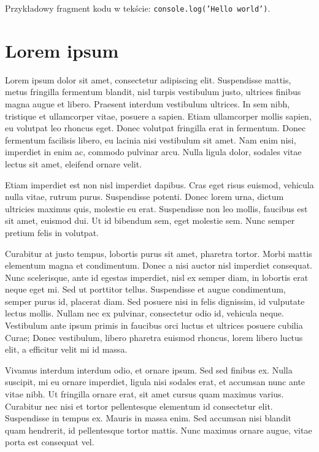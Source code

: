\documentclass[a4paper,12pt,polish,twoside]{extreport}
\begin{document}
Przykładowy fragment kodu w tekście: \texttt{console.log('Hello world')}.

\section{Lorem ipsum}
Lorem ipsum dolor sit amet, consectetur adipiscing elit. Suspendisse mattis, metus fringilla fermentum blandit, nisl turpis vestibulum justo, ultrices finibus magna augue et libero. Praesent interdum vestibulum ultrices. In sem nibh, tristique et ullamcorper vitae, posuere a sapien. Etiam ullamcorper mollis sapien, eu volutpat leo rhoncus eget. Donec volutpat fringilla erat in fermentum. Donec fermentum facilisis libero, eu lacinia nisi vestibulum sit amet. Nam enim nisi, imperdiet in enim ac, commodo pulvinar arcu. Nulla ligula dolor, sodales vitae lectus sit amet, eleifend ornare velit.

Etiam imperdiet est non nisl imperdiet dapibus. Cras eget risus euismod, vehicula nulla vitae, rutrum purus. Suspendisse potenti. Donec lorem urna, dictum ultricies maximus quis, molestie eu erat. Suspendisse non leo mollis, faucibus est sit amet, euismod dui. Ut id bibendum sem, eget molestie sem. Nunc semper pretium felis in volutpat.

Curabitur at justo tempus, lobortis purus sit amet, pharetra tortor. Morbi mattis elementum magna et condimentum. Donec a nisi auctor nisl imperdiet consequat. Nunc scelerisque, ante id egestas imperdiet, nisl ex semper diam, in lobortis erat neque eget mi. Sed ut porttitor tellus. Suspendisse et augue condimentum, semper purus id, placerat diam. Sed posuere nisi in felis dignissim, id vulputate lectus mollis. Nullam nec ex pulvinar, consectetur odio id, vehicula neque. Vestibulum ante ipsum primis in faucibus orci luctus et ultrices posuere cubilia Curae; Donec vestibulum, libero pharetra euismod rhoncus, lorem libero luctus elit, a efficitur velit mi id massa.

Vivamus interdum interdum odio, et ornare ipsum. Sed sed finibus ex. Nulla suscipit, mi eu ornare imperdiet, ligula nisi sodales erat, et accumsan nunc ante vitae nibh. Ut fringilla ornare erat, sit amet cursus quam maximus varius. Curabitur nec nisi et tortor pellentesque elementum id consectetur elit. Suspendisse in tempus ex. Mauris in massa enim. Sed accumsan nisi blandit quam hendrerit, id pellentesque tortor mattis. Nunc maximus ornare augue, vitae porta est consequat vel.
\end{document}
